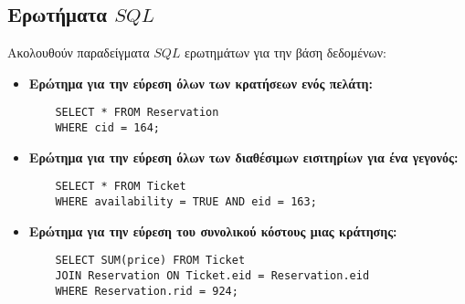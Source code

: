 \documentclass{article}
\begin{document}
\subsection*{Ερωτήματα $SQL$}
Ακολουθούν παραδείγματα $SQL$ ερωτημάτων για την βάση δεδομένων:
\begin{itemize}
    \item \textbf{Ερώτημα για την εύρεση όλων των κρατήσεων ενός πελάτη:}
    \begin{lstlisting}
    SELECT * FROM Reservation
    WHERE cid = 164; 
    \end{lstlisting}
    \item \textbf{Ερώτημα για την εύρεση όλων των διαθέσιμων εισιτηρίων για ένα γεγονός:}
    \begin{lstlisting}
    SELECT * FROM Ticket
    WHERE availability = TRUE AND eid = 163;
    \end{lstlisting}
    \item \textbf{Ερώτημα για την εύρεση του συνολικού κόστους μιας κράτησης:}
    \begin{lstlisting}
    SELECT SUM(price) FROM Ticket
    JOIN Reservation ON Ticket.eid = Reservation.eid
    WHERE Reservation.rid = 924;
    \end{lstlisting}
\end{itemize}
\end{document}
